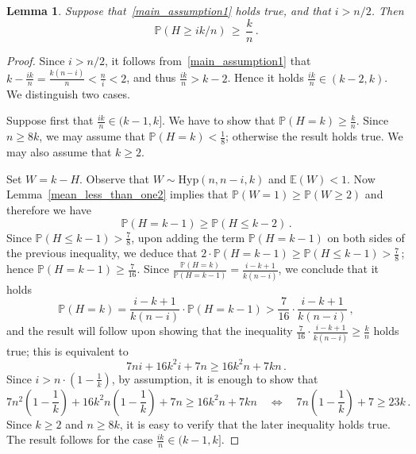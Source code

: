 \documentclass[10pt]{article}
\theoremstyle{plain}
\newtheorem{lemma}[theorem]{Lemma}
\theoremstyle{definition}
\theoremstyle{remark}
\begin{document}
\begin{lemma}
Suppose that~\eqref{main_assumption1} holds true, and 
that $i>n/2$.  
Then  
\[
\mathbb{P}(H \ge ik/n) \, \ge \, \frac{k}{n} \, .
\]  
\end{lemma}
\begin{proof}
Since $i>n/2$, it follows from~\eqref{main_assumption1} that 
$k-\frac{ik}{n} = \frac{k(n-i)}{n} < \frac{n}{i} < 2$, and thus  $\frac{ik}{n} > k-2$. 
Hence it holds $\frac{ik}{n}\in (k-2,k)$. 
We distinguish two cases. 

Suppose first that $\frac{ik}{n}\in (k-1,k]$. 
We have to show that $\mathbb{P}(H=k)\ge \frac{k}{n}$. Since $n\ge 8k$, we may assume that $\mathbb{P}(H=k)<\frac{1}{8}$; otherwise the result holds true. 
We may also assume that $k\ge 2$. 

Set $W = k -H$. Observe that $W\sim\text{Hyp}(n,n-i,k)$ and $\mathbb{E}(W)<1$. 
Now Lemma~\ref{mean_less_than_one2} implies that 
$\mathbb{P}(W=1)\ge \mathbb{P}(W\ge 2)$ and therefore we have  
\begin{equation*}
\mathbb{P}(H= k-1) \ge \mathbb{P}(H \le k-2) \, .
\end{equation*}
Since $\mathbb{P}(H \le k-1) > \frac{7}{8}$, 
upon adding the term $\mathbb{P}(H= k-1)$ on both sides of the previous inequality, we deduce that 
$2\cdot\mathbb{P}(H=k-1) \ge \mathbb{P}(H \le k-1) > \frac{7}{8}$\,; hence  
$\mathbb{P}(H=k-1) \ge\frac{7}{16}$.
Since $\frac{\mathbb{P}(H=k)}{\mathbb{P}(H=k-1)}=\frac{i-k+1}{k(n-i)}$, we conclude that it holds 
\[
\mathbb{P}(H=k) = \frac{i-k+1}{k(n-i)}\cdot \mathbb{P}(H=k-1) > \frac{7}{16}\cdot\frac{i-k+1}{k(n-i)} \, ,
\]
and the result will follow upon showing that the inequality $\frac{7}{16}\cdot\frac{i-k+1}{k(n-i)}\ge \frac{k}{n}$ holds true; this is equivalent to 
\begin{equation*}
7ni + 16k^2 i + 7n \ge 16k^2n + 7kn \, .
\end{equation*}
Since $i > n\cdot (1- \frac{1}{k})$, by assumption, it is enough to show that 
\[
7n^2\left(1- \frac{1}{k}\right) + 16k^2n\left(1- \frac{1}{k}\right) + 7n \ge 16k^2n+7kn \quad \Longleftrightarrow \quad 7n\left(1- \frac{1}{k}\right) +7 \ge 23k \, .
\]
Since $k\ge 2$ and $n\ge 8k$, it is easy to verify that the later inequality holds true. 
The result follows for the case $\frac{ik}{n}\in (k-1,k]$. 


\end{proof}
\end{document}
